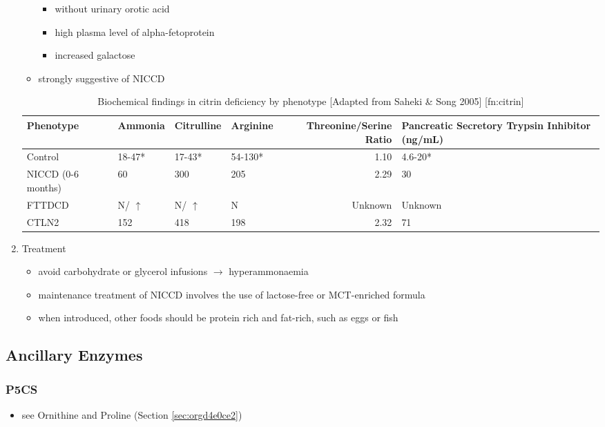 \documentclass[12pt]{scrartcl}
\begin{document}
\begin{center}
\begin{center}
\begin{enumerate}
\begin{itemize}
\begin{itemize}
\item without urinary orotic acid
\item high plasma level of alpha-fetoprotein
\item \textpm{} increased galactose
\end{itemize}
\item strongly suggestive of  NICCD
\end{itemize}



\begin{table}[htbp]
\caption{\label{tab:orgc87d09e}Biochemical findings in citrin deficiency by phenotype [Adapted from Saheki \& Song 2005] [fn:citrin]}
\centering
\begin{tabular}{llllrl}
Phenotype & Ammonia & Citrulline & Arginine & Threonine/Serine Ratio & Pancreatic Secretory Trypsin Inhibitor (ng/mL)\\
\hline
Control & 18-47* & 17-43* & 54-130* & 1.10 & 4.6-20*\\
NICCD (0-6 months) & 60 & 300 & 205 & 2.29 & 30\\
FTTDCD & N/ \(\uparrow\) & N/ \(\uparrow\) & N & Unknown & Unknown\\
CTLN2 & 152 & 418 & 198 & 2.32 & 71\\
\end{tabular}
\end{table}

\item Treatment
\label{sec:org61b45e6}
\begin{itemize}
\item avoid carbohydrate or glycerol infusions \(\to\) hyperammonaemia
\item maintenance treatment of NICCD involves the use of lactose-free or
MCT-enriched formula
\item when introduced, other foods should be protein rich and fat-rich,
such as eggs or fish
\end{itemize}
\end{enumerate}
\subsection{Ancillary Enzymes}
\label{sec:org3e660ff}
\subsubsection{P5CS}
\label{sec:org22f6245}
\begin{itemize}
\item see Ornithine and Proline (Section \ref{sec:orgd4e0ce2})
\end{itemize}

\end{center}
\end{center}
\end{document}
